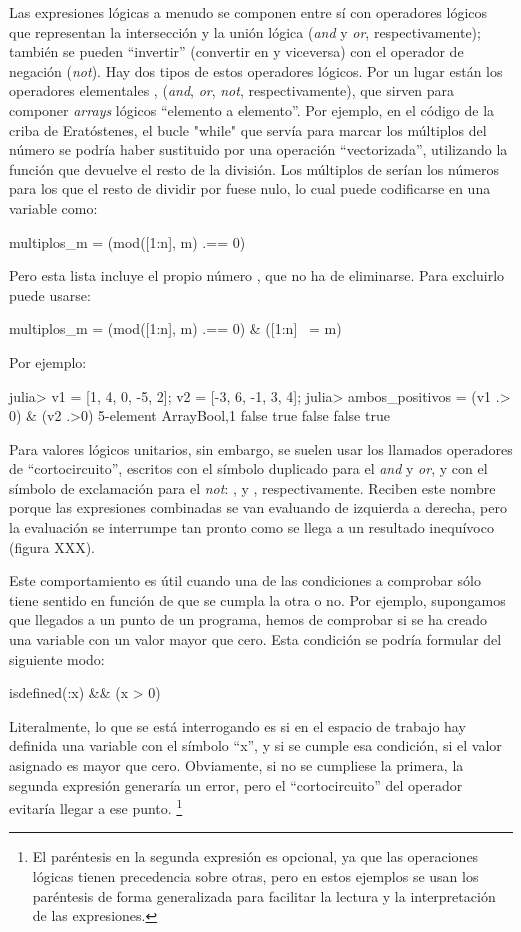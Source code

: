 ﻿\documentclass[spanish]{article}
\begin{document}
Las expresiones lógicas a menudo se componen entre sí con operadores lógicos que representan la intersección y la unión lógica (\emph{and} y \emph{or}, respectivamente); también se pueden ``invertir'' (convertir  en  y viceversa) con el operador de negación (\emph{not}). Hay dos tipos de estos operadores lógicos. Por un lugar están los operadores elementales \code{&} \code{|}, \code{~} (\emph{and}, \emph{or}, \emph{not}, respectivamente), que sirven para componer \emph{arrays} lógicos ``elemento a elemento''. Por ejemplo, en el código de la criba de Eratóstenes, el bucle "while" que servía para marcar los múltiplos del número  se podría haber sustituido por una operación ``vectorizada'', utilizando la función  que devuelve el resto de la división. Los múltiplos de  serían los números para los que el resto de dividir por  fuese nulo, lo cual puede codificarse en una variable como:

multiplos_m = (mod([1:n], m) .== 0)

Pero esta lista incluye el propio número , que no ha de eliminarse. Para excluirlo puede usarse:

multiplos_m = (mod([1:n], m) .== 0) & ([1:n] ~= m)




Por ejemplo:

julia> v1 = [1, 4, 0, -5, 2]; v2 = [-3, 6, -1, 3, 4];
julia> ambos_positivos = (v1 .> 0) & (v2 .>0)
5-element Array{Bool,1}
 false
  true
 false
 false
  true

Para valores lógicos unitarios, sin embargo, se suelen usar los llamados operadores de ``cortocircuito'', escritos con el símbolo duplicado para el \emph{and} y \emph{or}, y con el símbolo de exclamación para el \emph{not}: \code{&&}, \code{||} y \code{!}, respectivamente. Reciben este nombre porque las expresiones combinadas se van evaluando de izquierda a derecha, pero la evaluación se interrumpe tan pronto como se llega a un resultado inequívoco (figura XXX).

Este comportamiento es útil cuando una de las condiciones a comprobar sólo tiene sentido en función de que se cumpla la otra o no. Por ejemplo, supongamos que llegados a un punto de un programa, hemos de comprobar si se ha creado una variable  con un valor mayor que cero. Esta condición se podría formular del siguiente modo:

isdefined(:x) && (x > 0)

Literalmente, lo que se está interrogando es si en el espacio de trabajo hay definida una variable con el símbolo ``x'', y si se cumple esa condición, si el valor asignado es mayor que cero. Obviamente, si no se cumpliese la primera, la segunda expresión generaría un error, pero el ``cortocircuito'' del operador \code{&&} evitaría llegar a ese punto.%
\footnote{%
El paréntesis en la segunda expresión es opcional, ya que las
operaciones lógicas tienen precedencia sobre otras, pero en estos ejemplos
se usan los paréntesis de forma generalizada para facilitar la lectura y
la interpretación de las expresiones.%
}
\end{document}
